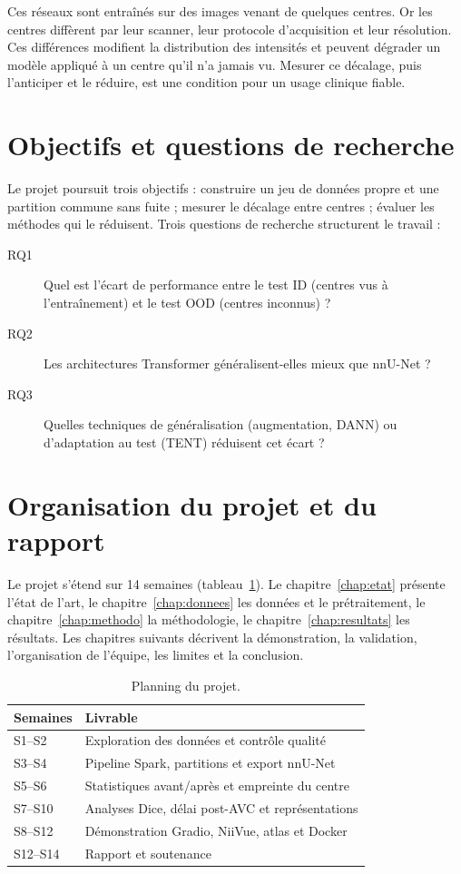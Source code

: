 \documentclass[11pt,a4paper]{report}
\begin{document}
Ces réseaux sont entraînés sur des images venant de quelques centres. Or les
centres diffèrent par leur scanner, leur protocole d'acquisition et leur
résolution. Ces différences modifient la distribution des intensités et
peuvent dégrader un modèle appliqué à un centre qu'il n'a jamais vu. Mesurer
ce décalage, puis l'anticiper et le réduire, est une condition pour un usage
clinique fiable.

\section{Objectifs et questions de recherche}

Le projet poursuit trois objectifs : construire un jeu de données propre et
une partition commune sans fuite ; mesurer le décalage entre centres ;
évaluer les méthodes qui le réduisent. Trois questions de recherche
structurent le travail :

\begin{description}
  \item[RQ1] Quel est l'écart de performance entre le test ID (centres vus à
  l'entraînement) et le test OOD (centres inconnus) ?
  \item[RQ2] Les architectures Transformer généralisent-elles mieux que
  nnU-Net ?
  \item[RQ3] Quelles techniques de généralisation (augmentation, DANN) ou
  d'adaptation au test (TENT) réduisent cet écart ?
\end{description}

\section{Organisation du projet et du rapport}

Le projet s'étend sur 14 semaines (tableau~\ref{tab:planning}). Le
chapitre~\ref{chap:etat} présente l'état de l'art, le
chapitre~\ref{chap:donnees} les données et le prétraitement, le
chapitre~\ref{chap:methodo} la méthodologie, le chapitre~\ref{chap:resultats}
les résultats. Les chapitres suivants décrivent la démonstration, la
validation, l'organisation de l'équipe, les limites et la conclusion.

\begin{table}[H]
  \centering
  \caption{Planning du projet.}
  \label{tab:planning}
  \begin{tabular}{ll}
    \toprule
    \textbf{Semaines} & \textbf{Livrable} \\
    \midrule
    S1--S2   & Exploration des données et contrôle qualité \\
    S3--S4   & Pipeline Spark, partitions et export nnU-Net \\
    S5--S6   & Statistiques avant/après et empreinte du centre \\
    S7--S10  & Analyses Dice, délai post-AVC et représentations \\
    S8--S12  & Démonstration Gradio, NiiVue, atlas et Docker \\
    S12--S14 & Rapport et soutenance \\
    \bottomrule
  \end{tabular}
\end{table}
\end{document}
